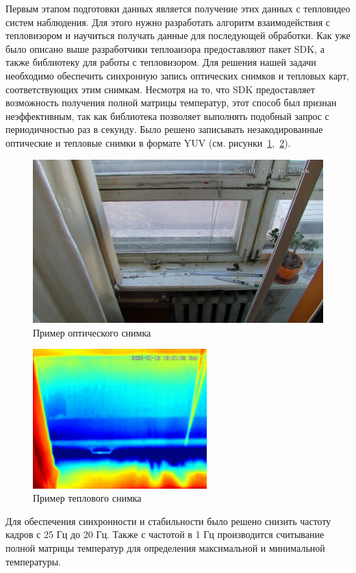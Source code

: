 \documentclass[14pt, a4paper]{extreport}
\begin{document}
	Первым этапом подготовки данных является получение этих данных с тепловидео систем наблюдения. Для этого нужно разработать алгоритм взаимодействия с тепловизором и научиться получать данные для последующей обработки. Как уже было описано выше разработчики теплоаизора предоставляют пакет SDK, а также библиотеку для работы с тепловизором.
	Для решения нашей задачи необходимо обеспечить синхронную запись оптических снимков и тепловых карт, соответствующих этим снимкам. Несмотря на то, что SDK предоставляет возможность получения полной матрицы температур, этот способ был признан неэффективным, так как библиотека позволяет выполнять подобный запрос с периодичностью раз в секунду. Было решено записывать незакодированные оптические и тепловые снимки в формате YUV (см. рисунки~\ref{fig:opt_example},~\ref{fig:tep_example}). 
	\begin{figure}[h!]
		\centering
		\includegraphics[width = 13cm]{image/chapter_2/opt_example}	
		\caption{Пример оптического снимка}
		\label{fig:opt_example}
	\end{figure}
	
	\begin{figure}[h!]
		\centering
		\includegraphics[width = 0.6\textwidth]{image/chapter_2/tep_example}	
		\caption{Пример теплового снимка}
		\label{fig:tep_example}
	\end{figure}
	Для обеспечения синхронности и стабильности было решено снизить частоту кадров с 25 Гц до 20 Гц. Также с частотой в 1 Гц производится считывание полной матрицы температур для определения максимальной и минимальной температуры. 
	
\end{document}
